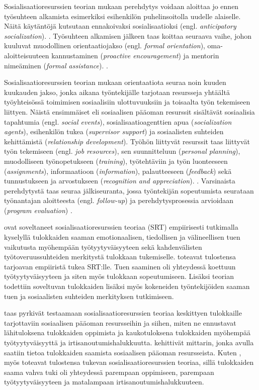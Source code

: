 \documentclass[utf8]{gradu3}
\begin{document}
Sosialisaatioresurssien teorian mukaan perehdytys voidaan aloittaa jo ennen työsuhteen alkamista esimerkiksi esihenkilön puhelinsoitolla uudelle alaiselle. Näitä käytäntöjä kutsutaan ennakoivaksi sosialisaatioksi (engl. \textit{anticipatory socialization}). \parencite{saks-gruman-2012}. Työsuhteen alkamisen jälkeen taas koittaa seuraava vaihe, johon kuuluvat muodollinen orientaatiojakso (engl. \textit{formal orientation}), oma-aloitteisuuteen kannustaminen (\textit{proactive encouragement}) ja mentorin nimeäminen (\textit{formal assistance}). \parencite{saks-gruman-2012}.

Sosialisaatioresurssien teorian mukaan orientaatiota seuraa noin kuuden kuukauden jakso, jonka aikana työntekijälle tarjotaan resursseja yhtäältä työyhteisössä toimimisen sosiaalisiin ulottuvuuksiin ja toisaalta työn tekemiseen liittyen. Näistä ensimmäiset eli sosiaalisen pääoman resurssit sisältävät sosiaalisia tapahtumia (engl. \textit{social events}), sosialisaatioagenttien apua (\textit{socialization agents}), esihenkilön tukea (\textit{supervisor support}) ja sosiaalisten suhteiden kehittämistä (\textit{relationship development}). Työhön liittyvät resurssit taas liittyvät työn tekemiseen (engl. \textit{job resources}), sen suunnitteluun (\textit{personal planning}), muodolliseen työnopetukseen (\textit{training}), työtehtäviin ja työn luonteeseen (\textit{assignments}), informaatioon (\textit{information}), palautteeseen (\textit{feedback}) sekä tunnustukseen ja arvostukseen (\textit{recognition and appreciation}). \parencite{saks-gruman-2012}. Varsinaista perehdytystä taas seuraa jälkiseuranta, jossa työntekijän sopeutumista seurataan työnantajan aloitteesta (engl. \textit{follow-up}) ja perehdytysprosessia arvioidaan (\textit{program evaluation}) \parencite{saks-gruman-2012}.

\textcite{cranmer-ym-2016} ovat soveltaneet sosialisaatioresurssien teoriaa (SRT) empiirisesti tutkimalla kyselyllä tulokkaiden saaman emotionaalisen, tiedollisen ja välineellisen tuen vaikutusta myöhempään työtyytyväisyyteen sekä kahdenvälisten työtoveruussuhteiden merkitystä tulokkaan tukemiselle. \textcite{cranmer-ym-2016} toteavat tulostensa tarjoavan empiiristä tukea SRT:lle. Tuen saaminen oli yhteydessä koettuun työtyytyväisyyteen ja siten myös tulokkaan sopeutumiseen. Lisäksi teorian todettiin soveltuvan tulokkaiden lisäksi myös kokeneiden työntekijöiden saaman tuen ja sosiaalisten suhteiden merkityksen tutkimiseen. 

\textcite{harris-ym-2022} taas pyrkivät testaamaan sosialisaatioresurssien teoriaa keskittyen tulokkaille tarjottaviin sosiaalisen pääoman resursseihin ja siihen, miten ne ennustavat lähituloksena tulokkaiden oppimista ja kaukotuloksena tulokkaiden myöhempää työtyytyväisyyttä ja irtisanoutumishalukkuutta. \textcite{harris-ym-2022} kehittivät mittarin, jonka avulla saatiin tietoa tulokkaiden saamista sosiaalisen pääoman resursseista. Kuten \textcite{cranmer-ym-2016}, myös \textcite{harris-ym-2022} toteavat tulostensa tukevan sosialisaatioresurssien teoriaa, sillä tulokkaiden saama vahva tuki oli yhteydessä parempaan oppimiseen, parempaan työtyytyväisyyteen ja matalampaan irtisanoutumishalukkuuteen.
\end{document}
